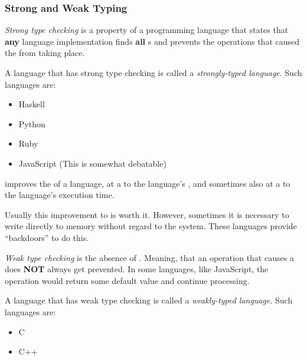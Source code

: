 \subsubsection{Strong and Weak Typing}\label{subsubsec:Strong_Weak_Typing}
\begin{definition}\label{def:Strong_Type_Checking}
  \emph{Strong type checking} is a property of a programming language that states that \textbf{any} language implementation finds \textbf{all} s and prevents the operations that caused the  from taking place.

  A language that has strong type checking is called a \emph{strongly-typed language}.
  Such languages are:
  \begin{itemize}[noitemsep]
  \item Haskell
  \item Python
  \item Ruby
  \item JavaScript (This is somewhat debatable)
  \end{itemize}

  \begin{remark}[Cost]\label{rmk:Strong_Type_Checking_Cost}
     improves the  of a language, at a  to the language's , and sometimes also at a  to the language's execution time.

    Usually this improvement to  is worth it.
    However, sometimes it is necessary to write directly to memory without regard to the  system.
    These languages provide ``backdoors'' to do this.
  \end{remark}
\end{definition}

\begin{definition}\label{def:Weak_Type_Checking}
  \emph{Weak type checking} is the absence of .
  Meaning, that an operation that causes a  does \textbf{NOT} always get prevented.
  In some languages, like JavaScript, the operation would return some default value and continue processing.

  A language that has weak type checking is called a \emph{weakly-typed language}.
  Such languages are:
  \begin{itemize}[noitemsep]
  \item C
  \item C++
  \end{itemize}
\end{definition}

